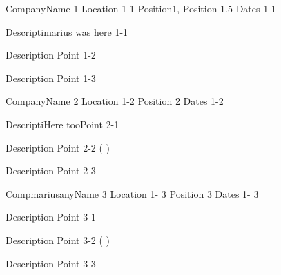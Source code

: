 

\begin{cventries}

  \cventry
    {CompanyName 1}
    {Location 1-1}
    {Position1, Position 1.5}
    {Dates 1-1}
    {
      \begin{cvitems}
        \item{Descriptimarius was here 1-1}
        \item{Description Point 1-2}
        \item{Description Point 1-3}
      \end{cvitems}
    }

  \cventry
    {CompanyName 2}
    {Location 1-2}
    {Position 2}
    {Dates 1-2}
    {
      \begin{cvitems}
        \item{DescriptiHere tooPoint 2-1}
        \item{Description Point 2-2 (  )}
        \item{Description Point 2-3}
      \end{cvitems}
    }

  \cventry
    {CompmariusanyName 3}
    {Location 1- 3}
    {Position 3}
    {Dates 1- 3}
    {
      \begin{cvitems}
        \item{Description Point 3-1}
        \item{Description Point 3-2 (  )}
        \item{Description Point 3-3}
      \end{cvitems}
    }

\end{cventries}


